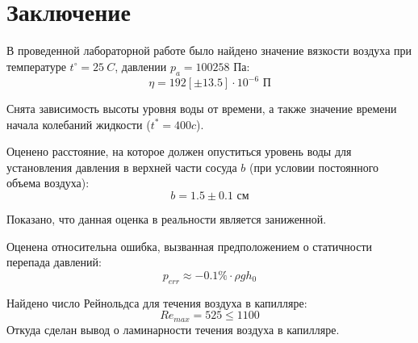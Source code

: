 \documentclass[a4paper,12pt]{article}%
\begin{document}
\newpage
\section*{Заключение}



В проведенной лабораторной работе было найдено значение вязкости воздуха при температуре $t^\circ=25\ C$, давлении $p_a=100258 $ Па:
\begin{equation}
	\eta=192[\pm13.5] \cdot 10^{-6} \text{ П}
\end{equation}

Снята зависимость высоты уровня воды от времени, а также значение времени начала колебаний жидкости ($t^*=400 c$).

Оценено расстояние, на которое должен опуститься уровень воды для установления давления в верхней части сосуда $b$ (при условии постоянного объема воздуха):
\begin{equation}
	b=1.5\pm0.1 \text{ см}
\end{equation}

Показано, что данная оценка в реальности является заниженной.

Оценена относительна ошибка, вызванная предположением о статичности перепада давлений:
\begin{equation}
	p_{err}\approx -0.1\%\cdot \rho g h_0
\end{equation}

Найдено число Рейнольдса для течения воздуха в капилляре:
\begin{equation}
	Re_{max}=525 \leq 1100
\end{equation}
Откуда сделан вывод о ламинарности течения воздуха в капилляре.
\end{document}

